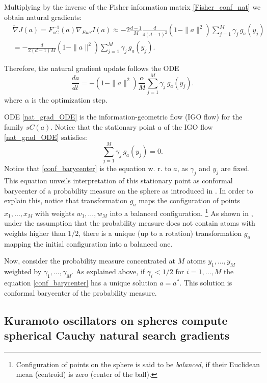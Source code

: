 \documentclass{article}
\theoremstyle{plain}%
\theoremstyle{definition}
\theoremstyle{remark}
\theoremstyle{prop}
\begin{document}
Multiplying by the inverse of the Fisher information matrix \eqref{Fisher_conf_nat} we obtain natural gradients:
\begin{equation}
\label{sC_nat_policy_gradients}
\begin{split}
& \tilde \nabla J(a) = F_{sC}^{-1}(a) \nabla_{Euc} J(a) \approx - 2 \frac{d-1}{M} \frac{d}{4 (d-1)^2} (1-\| a \|^2) \sum_{j=1}^M \gamma_j \, g_a(y_j) \\
& = - \frac{d}{2(d-1)M} (1-\| a \|^2) \sum_{j=1}^M \gamma_j \, g_a(y_j). 
\end{split}
\end{equation}

Therefore, the natural gradient update follows the ODE
\begin{equation}
\label{nat_grad_ODE}
\frac{da}{dt} = - (1 - \| a \|^2) \frac{\alpha}{M} \sum_{j=1}^M \gamma_j \, g_a(y_j).
\end{equation}
where $\alpha$ is the optimization step.

ODE \eqref{nat_grad_ODE} is the information-geometric flow (IGO flow) for the family $sC(a)$. Notice that the stationary point $a$ of the IGO flow \eqref{nat_grad_ODE} satisfies:
\begin{equation}
\label{conf_barycenter}
\sum_{j=1}^M \gamma_j \, g_a(y_j) = 0.
\end{equation}
Notice that \eqref{conf_barycenter} is the equation w. r. to $a$, as $\gamma_j$ and $y_j$ are fixed. This equation unveils interpretation of this stationary point as conformal barycenter of a probability measure on the sphere as introduced in \cite{DE}. In order to explain this, notice that transformation $g_a$ maps the configuration of points $x_1,\dots,x_M$ with weights $w_1,\dots,w_M$ into a balanced configuration. \footnote{Configuration of points on the sphere is said to be {\it balanced}, if their Euclidean mean (centroid) is zero (center of the ball).} As shown in \cite{DE}, under the assumption that the probability measure does not contain atoms with weights higher than $1/2$, there is a unique (up to a rotation) transformation $g_a$ mapping the initial configuration into a balanced one. 

Now, consider the probability measure concentrated at $M$ atoms $y_1,\dots,y_M$ weighted by $\gamma_1,\dots,\gamma_M$. As explained above, if $\gamma_i<1/2$ for $i=1,\dots,M$ the equation \eqref{conf_barycenter} has a unique solution $a = a^*$. This solution is conformal barycenter of the probability measure.


\subsection{Kuramoto oscillators on spheres compute spherical Cauchy natural search gradients}
\end{document}
